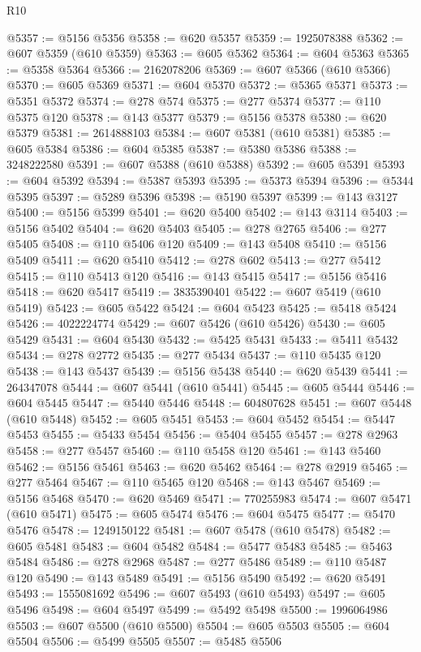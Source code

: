 \begin{lexlean}{R10}
\begin{coremodule}
@5357 := @5156 @5356
@5358 := @620 @5357
@5359 := 1925078388
@5362 := @607 @5359 (@610 @5359)
@5363 := @605 @5362
@5364 := @604 @5363
@5365 := @5358 @5364
@5366 := 2162078206
@5369 := @607 @5366 (@610 @5366)
@5370 := @605 @5369
@5371 := @604 @5370
@5372 := @5365 @5371
@5373 := @5351 @5372
@5374 := @278 @574
@5375 := @277 @5374
@5377 := @110 @5375 @120
@5378 := @143 @5377
@5379 := @5156 @5378
@5380 := @620 @5379
@5381 := 2614888103
@5384 := @607 @5381 (@610 @5381)
@5385 := @605 @5384
@5386 := @604 @5385
@5387 := @5380 @5386
@5388 := 3248222580
@5391 := @607 @5388 (@610 @5388)
@5392 := @605 @5391
@5393 := @604 @5392
@5394 := @5387 @5393
@5395 := @5373 @5394
@5396 := @5344 @5395
@5397 := @5289 @5396
@5398 := @5190 @5397
@5399 := @143 @3127
@5400 := @5156 @5399
@5401 := @620 @5400
@5402 := @143 @3114
@5403 := @5156 @5402
@5404 := @620 @5403
@5405 := @278 @2765
@5406 := @277 @5405
@5408 := @110 @5406 @120
@5409 := @143 @5408
@5410 := @5156 @5409
@5411 := @620 @5410
@5412 := @278 @602
@5413 := @277 @5412
@5415 := @110 @5413 @120
@5416 := @143 @5415
@5417 := @5156 @5416
@5418 := @620 @5417
@5419 := 3835390401
@5422 := @607 @5419 (@610 @5419)
@5423 := @605 @5422
@5424 := @604 @5423
@5425 := @5418 @5424
@5426 := 4022224774
@5429 := @607 @5426 (@610 @5426)
@5430 := @605 @5429
@5431 := @604 @5430
@5432 := @5425 @5431
@5433 := @5411 @5432
@5434 := @278 @2772
@5435 := @277 @5434
@5437 := @110 @5435 @120
@5438 := @143 @5437
@5439 := @5156 @5438
@5440 := @620 @5439
@5441 := 264347078
@5444 := @607 @5441 (@610 @5441)
@5445 := @605 @5444
@5446 := @604 @5445
@5447 := @5440 @5446
@5448 := 604807628
@5451 := @607 @5448 (@610 @5448)
@5452 := @605 @5451
@5453 := @604 @5452
@5454 := @5447 @5453
@5455 := @5433 @5454
@5456 := @5404 @5455
@5457 := @278 @2963
@5458 := @277 @5457
@5460 := @110 @5458 @120
@5461 := @143 @5460
@5462 := @5156 @5461
@5463 := @620 @5462
@5464 := @278 @2919
@5465 := @277 @5464
@5467 := @110 @5465 @120
@5468 := @143 @5467
@5469 := @5156 @5468
@5470 := @620 @5469
@5471 := 770255983
@5474 := @607 @5471 (@610 @5471)
@5475 := @605 @5474
@5476 := @604 @5475
@5477 := @5470 @5476
@5478 := 1249150122
@5481 := @607 @5478 (@610 @5478)
@5482 := @605 @5481
@5483 := @604 @5482
@5484 := @5477 @5483
@5485 := @5463 @5484
@5486 := @278 @2968
@5487 := @277 @5486
@5489 := @110 @5487 @120
@5490 := @143 @5489
@5491 := @5156 @5490
@5492 := @620 @5491
@5493 := 1555081692
@5496 := @607 @5493 (@610 @5493)
@5497 := @605 @5496
@5498 := @604 @5497
@5499 := @5492 @5498
@5500 := 1996064986
@5503 := @607 @5500 (@610 @5500)
@5504 := @605 @5503
@5505 := @604 @5504
@5506 := @5499 @5505
@5507 := @5485 @5506

\end{coremodule}
\end{lexlean}
